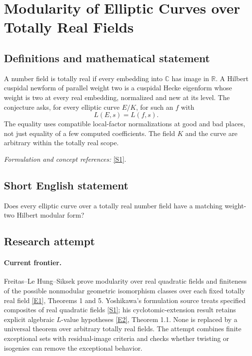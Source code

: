\documentclass[11pt,a4paper]{article}
\newcommand{\R}{\mathbb{R}}
\newcommand{\C}{\mathbb{C}}
\newcommand{\sref}[2]{\hyperlink{source:#1:#2}{[S#2]}}
\newcommand{\eref}[2]{\hyperlink{extra:#1:#2}{[E#2]}}
\newif\ifshowcatalogue
\newcommand{\cataloguescope}[1]{\ifshowcatalogue
 \paragraph{Exact scope in the supplied catalogue.}
 \begin{quote}\small #1\end{quote}\fi}
\numberwithin{equation}{section}
\begin{document}
\setcounter{section}{0}
\clearpage
\section*{\texorpdfstring{Modularity of Elliptic Curves over Totally Real Fields}{Modularity of Elliptic Curves over Totally Real Fields}}\label{statement}
\subsection{Definitions and mathematical statement}
A number field is totally real if every embedding into $\C$ has image in $\R$. A Hilbert cuspidal newform of parallel weight two is a cuspidal Hecke eigenform whose weight is two at every real embedding, normalized and new at its level. The conjecture asks, for every elliptic curve $E/K$, for such an $f$ with
\[
 L(E,s)=L(f,s).
\]
The equality uses compatible local-factor normalizations at good and bad places, not just equality of a few computed coefficients. The field $K$ and the curve are arbitrary within the totally real scope.
\par\smallskip\textit{Formulation and concept references:} \sref{statement}{1}.
\cataloguescope{For every totally real number field K and every elliptic curve E over K, prove that there is a Hilbert cuspidal newform f over K of parallel weight 2 satisfying L(E,s)=L(f,s).}
\subsection{Short English statement}
Does every elliptic curve over a totally real number field have a matching weight-two Hilbert modular form?
\subsection{Research attempt}

\paragraph{Current frontier.}
Freitas--Le Hung--Siksek prove modularity over real quadratic fields and finiteness of the possible nonmodular geometric isomorphism classes over each fixed totally real field \eref{statement}{1}, Theorems 1 and 5. Yoshikawa's formulation source treats specified composites of real quadratic fields \sref{statement}{1}; his cyclotomic-extension result retains explicit algebraic $L$-value hypotheses \eref{statement}{2}, Theorem 1.1. None is replaced by a universal theorem over arbitrary totally real fields. The attempt combines finite exceptional sets with residual-image criteria and checks whether twisting or isogenies can remove the exceptional behavior.
\end{document}
